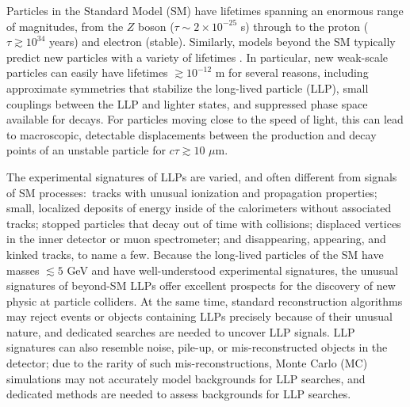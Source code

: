 Particles in the Standard Model (SM) have lifetimes spanning an enormous range of magnitudes, from the $Z$ boson ($\tau\sim2\times10^{-25}$ s) through to the proton ($\tau\gtrsim10^{34}$ years) and electron (stable). Similarly, models beyond the SM typically predict new particles with a variety of lifetimes \cite{massive-cite-dump}. In particular, new weak-scale particles can easily have lifetimes $\gtrsim10^{-12}$ m for several reasons, including approximate symmetries that stabilize the long-lived particle (LLP), small couplings between the LLP and lighter states, and suppressed phase space available for decays. For particles moving close to the speed of light, this can lead to macroscopic, detectable displacements between the production and decay points of an unstable particle for $c\tau\gtrsim 10\,\,\mu\mathrm{m}$.

The experimental signatures of LLPs are varied, and often different from signals of SM processes:~tracks with unusual ionization and propagation properties; small, localized deposits of energy inside of the calorimeters without associated tracks; stopped particles that decay out of time with collisions; displaced vertices in the inner detector or muon spectrometer; and disappearing, appearing, and kinked tracks, to name a few. Because the long-lived particles of the SM have masses $\lesssim5$ GeV and have well-understood experimental signatures, the unusual signatures of beyond-SM LLPs offer excellent prospects for the discovery of new physic at particle colliders. At the same time, standard reconstruction algorithms may reject events or objects containing LLPs precisely because of their unusual nature, and dedicated searches are needed to uncover LLP signals. LLP signatures can also resemble noise, pile-up, or mis-reconstructed objects in the detector; due to the rarity of such mis-reconstructions, Monte Carlo (MC) simulations may not accurately model backgrounds for LLP searches, and dedicated methods are needed to assess backgrounds for LLP searches.

